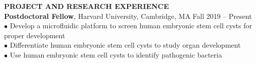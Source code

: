 \documentclass[10pt]{article}
\newenvironment{changemargin}[2]{%
  \list{}{\rightmargin#2\leftmargin#1
    \parsep=0pt\topsep=1pt\partopsep=0pt}
\item[]} {\endlist}
\newenvironment{indentmore}{\begin{changemargin}{10pt}{0cm}}{\end{changemargin}}
\begin{document}


\textbf{\large PROJECT AND RESEARCH EXPERIENCE}\\
{\bf Postdoctoral Fellow}, Harvard University, Cambridge, MA \hfill Fall 2019 -- Present\\
\hspace*{10pt}$\bullet$ Develop a microfluidic platform to screen human embryonic stem cell cysts for proper development\\
\hspace*{10pt}$\bullet$ Differentiate human embryonic stem cell cysts to study organ development\\
\hspace*{10pt}$\bullet$ Use human embryonic stem cell cysts to identify pathogenic bacteria \\
\end{document}
